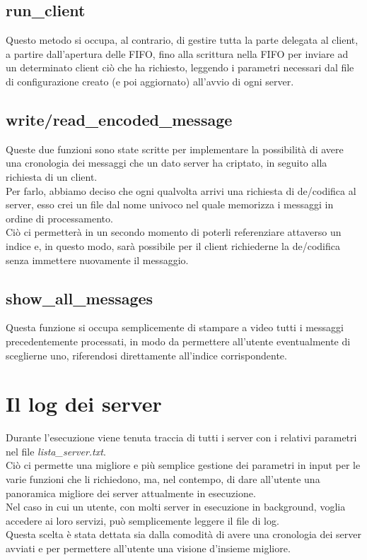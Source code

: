 \documentclass[a4paper,9pt]{article}
\begin{document}
\subsection{run\_client}
Questo metodo si occupa, al contrario, di gestire tutta la parte delegata al client, a partire dall'apertura delle FIFO, fino alla scrittura nella FIFO per inviare ad un determinato client ciò che ha richiesto, leggendo i parametri necessari dal file di configurazione creato (e poi aggiornato) all'avvio di ogni server.
\subsection{write/read\_encoded\_message}
Queste due funzioni sono state scritte per implementare la possibilità di avere una cronologia dei messaggi che un dato server ha criptato, in seguito alla richiesta di un client.\\
Per farlo, abbiamo deciso che ogni qualvolta arrivi una richiesta di de/codifica al server, esso crei un file dal nome univoco nel quale memorizza i messaggi in ordine di processamento.\\
Ciò ci permetterà in un secondo momento di poterli referenziare attaverso un indice e, in questo modo, sarà possibile per il client richiederne la de/codifica senza immettere nuovamente il messaggio.
\subsection{show\_all\_messages}
Questa funzione si occupa semplicemente di stampare a video tutti i messaggi precedentemente processati, in modo da permettere all'utente eventualmente di sceglierne uno, riferendosi direttamente all'indice corrispondente. 

\section{Il log dei server}
Durante l'esecuzione viene tenuta traccia di tutti i server con i relativi parametri nel file \emph{lista\_server.txt}.\\ 
Ciò ci permette una migliore e più semplice gestione dei parametri in input per le varie funzioni che li richiedono, ma, nel contempo, di dare all'utente una panoramica migliore dei server attualmente in esecuzione.\\
Nel caso in cui un utente, con molti server in esecuzione in background, voglia accedere ai loro servizi, può semplicemente leggere il file di log.\\
Questa scelta è stata dettata sia dalla comodità di avere una cronologia dei server avviati e per permettere all'utente una visione d'insieme migliore.
\end{document}

